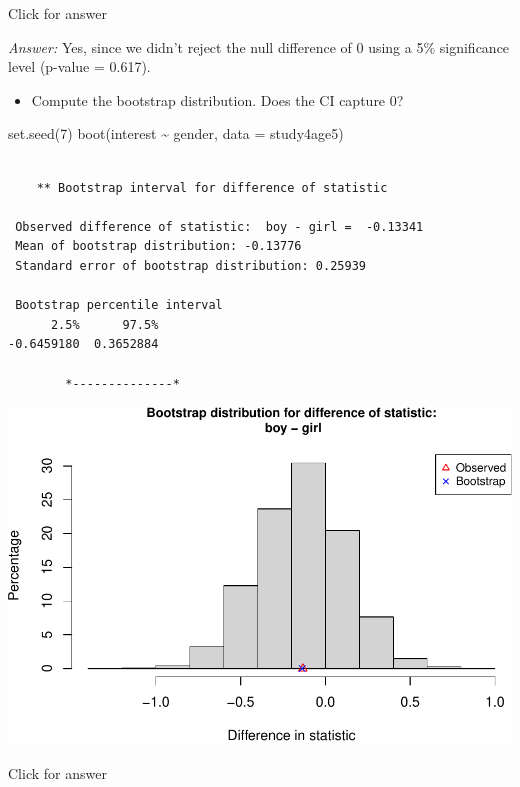 \documentclass[
]{book}
\newenvironment{Shaded}{\begin{snugshade}}{\end{snugshade}}
\newcommand{\AttributeTok}[1]{\textcolor[rgb]{0.77,0.63,0.00}{#1}}
\newcommand{\DecValTok}[1]{\textcolor[rgb]{0.00,0.00,0.81}{#1}}
\newcommand{\FunctionTok}[1]{\textcolor[rgb]{0.00,0.00,0.00}{#1}}
\newcommand{\NormalTok}[1]{#1}
\newcommand{\SpecialCharTok}[1]{\textcolor[rgb]{0.00,0.00,0.00}{#1}}
\providecommand{\tightlist}{%
  \setlength{\itemsep}{0pt}\setlength{\parskip}{0pt}}
\begin{document}
Click for answer

\emph{Answer:} Yes, since we didn't reject the null difference of 0 using a 5\% significance level (p-value = 0.617).

\begin{itemize}
\tightlist
\item
  Compute the bootstrap distribution. Does the CI capture 0?
\end{itemize}

\begin{Shaded}
\begin{Highlighting}[]
\FunctionTok{set.seed}\NormalTok{(}\DecValTok{7}\NormalTok{)}
\FunctionTok{boot}\NormalTok{(interest }\SpecialCharTok{\textasciitilde{}}\NormalTok{ gender, }\AttributeTok{data =}\NormalTok{ study4age5)}
\end{Highlighting}
\end{Shaded}

\begin{verbatim}

    ** Bootstrap interval for difference of statistic

 Observed difference of statistic:  boy - girl =  -0.13341 
 Mean of bootstrap distribution: -0.13776 
 Standard error of bootstrap distribution: 0.25939 

 Bootstrap percentile interval
      2.5%      97.5% 
-0.6459180  0.3652884 

        *--------------*
\end{verbatim}

\includegraphics[width=1\linewidth]{Class_Activity_14_files/figure-latex/unnamed-chunk-5-1}

Click for answer
\end{document}
